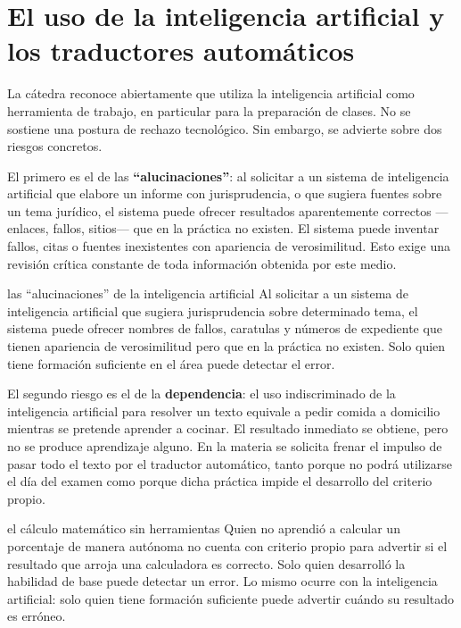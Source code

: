 \documentclass[12pt,oneside]{book}
\begin{document}
\section{El uso de la inteligencia artificial y los traductores automáticos}
\label{sec:ia}

La cátedra reconoce abiertamente que utiliza la inteligencia artificial como herramienta de trabajo, en particular para la preparación de clases. No se sostiene una postura de rechazo tecnológico. Sin embargo, se advierte sobre dos riesgos concretos.

El primero es el de las \textbf{``alucinaciones''}: al solicitar a un sistema de inteligencia artificial que elabore un informe con jurisprudencia, o que sugiera fuentes sobre un tema jurídico, el sistema puede ofrecer resultados aparentemente correctos ---enlaces, fallos, sitios--- que en la práctica no existen. El sistema puede inventar fallos, citas o fuentes inexistentes con apariencia de verosimilitud. Esto exige una revisión crítica constante de toda información obtenida por este medio.

\begin{example}{las ``alucinaciones'' de la inteligencia artificial}
Al solicitar a un sistema de inteligencia artificial que sugiera jurisprudencia sobre determinado tema, el sistema puede ofrecer nombres de fallos, caratulas y números de expediente que tienen apariencia de verosimilitud pero que en la práctica no existen. Solo quien tiene formación suficiente en el área puede detectar el error.
\end{example}

El segundo riesgo es el de la \textbf{dependencia}: el uso indiscriminado de la inteligencia artificial para resolver un texto equivale a pedir comida a domicilio mientras se pretende aprender a cocinar. El resultado inmediato se obtiene, pero no se produce aprendizaje alguno. En la materia se solicita frenar el impulso de pasar todo el texto por el traductor automático, tanto porque no podrá utilizarse el día del examen como porque dicha práctica impide el desarrollo del criterio propio.

\begin{example}{el cálculo matemático sin herramientas}
Quien no aprendió a calcular un porcentaje de manera autónoma no cuenta con criterio propio para advertir si el resultado que arroja una calculadora es correcto. Solo quien desarrolló la habilidad de base puede detectar un error. Lo mismo ocurre con la inteligencia artificial: solo quien tiene formación suficiente puede advertir cuándo su resultado es erróneo.
\end{example}
\end{document}

